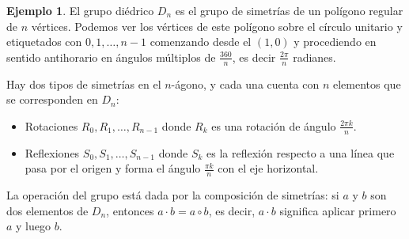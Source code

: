 \documentclass[12pt]{book}
\theoremstyle{definition}
\newtheorem{example}[theorem]{Ejemplo}
\newcounter{in}
\begin{document}
\begin{example}
\label{rep_die}
El grupo diédrico $D_{n}$ es el grupo de simetrías de un polígono
regular de $n$ vértices. Podemos ver los vértices de este polígono
sobre el círculo unitario y etiquetados con $0,1,\ldots,n-1$
comenzando desde el $(1, 0)$ y procediendo en sentido antihorario en
ángulos múltiplos de $\frac{360}{n}$, es decir $\frac{2 \pi}{n}$
radianes.

Hay dos tipos de simetrías en el $n$-ágono, y cada una
cuenta con $n$ elementos que se corresponden en $D_{n}$:
\begin{itemize}
\item Rotaciones $R_{0}, R_{1}, \ldots, R_{n-1}$ donde $R_{k}$ es una
rotación de ángulo $\frac{2 \pi k}{n}$.
\item Reflexiones $S_{0}, S_{1}, \ldots, S_{n-1}$ donde $S_{k}$ es la
reflexión respecto a una línea que pasa por el origen y forma el
ángulo $\frac{\pi k}{n}$ con el eje horizontal.
\end{itemize} La operación del grupo está dada por la composición de
simetrías: si $a$ y $b$ son dos elementos de $D_{n}$, entonces $a
\cdot b = a \circ b$, es decir, $a \cdot b$ significa aplicar primero
$a$ y luego $b$.


\end{example}
\end{document}
